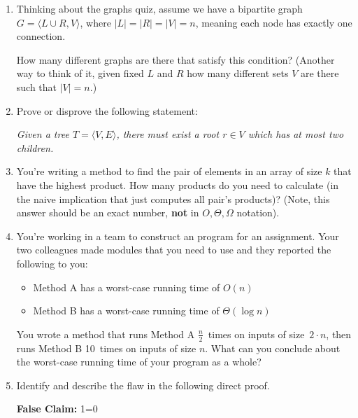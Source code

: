 \documentclass[11pt, oneside]{article}   	%
\begin{document}
\begin{enumerate}
\item Thinking about the graphs quiz, assume we have a bipartite graph $G=\langle L\cup R, V\rangle$, 
where $|L|=|R|=|V|=n$, meaning each node has exactly one connection. 

How many different graphs are there that satisfy this condition? (Another way to think of it, given fixed $L$ and $R$ how many different sets $V$ are there such that $|V|=n$.)
\vspace{5em}

\clearpage
\item Prove or disprove the following statement: 
\begin{center}
\textit{Given a tree $T=\langle V, E \rangle$, there must exist a root $r\in V$ which has at most two children. }
\end{center}
\vspace{7em}

\item You're writing a method to find the pair of elements in an array of size $k$ 
that have the highest product.
How many products do you need to calculate 
(in the naive implication that just computes all pair's products)?
(Note, this answer should be an exact number, \textbf{not} in $O,\Theta,\Omega$ notation). 
\vspace{5em}

\item You're working in a team to construct an program for an assignment. 
Your two colleagues made modules that you need to use and they reported the following to you: 
\begin{itemize}
\item Method A has a worst-case running time of $O(n)$
\item Method B has a worst-case running time of $\Theta(\log n)$
\end{itemize}
You wrote a method that runs Method A $\frac{n}{2}$~times on inputs of size~$2\cdot n$, 
then runs Method B 10~times on inputs of size $n$. 
What can you conclude about the worst-case running time of your program as a whole? 
\vspace{8em}

\item Identify and describe the flaw in the following direct proof. 

\textbf{False Claim:} 1=0


\end{enumerate}
\end{document}
